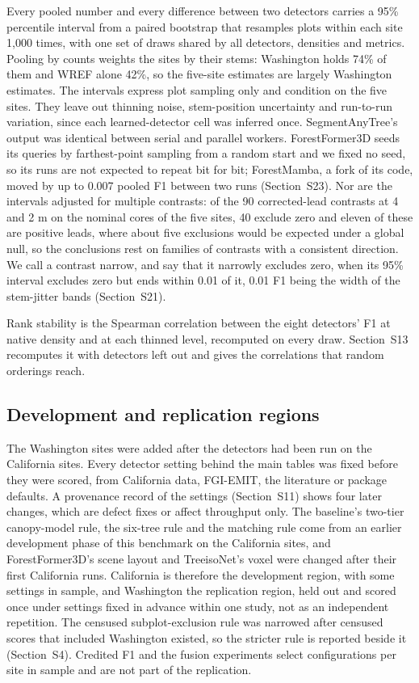 \documentclass[preprint,12pt,authoryear,a4paper]{elsarticle}
\begin{document}
Every pooled number and every difference between two detectors carries a 95\%
percentile interval from a paired bootstrap that resamples plots within each
site 1,000 times, with one set of draws shared by all detectors, densities and
metrics. Pooling by counts weights the sites by their stems: Washington holds
74\% of them and WREF alone 42\%, so the five-site estimates are largely
Washington estimates. The intervals express plot sampling only and condition on
the five sites. They leave out thinning noise, stem-position uncertainty and
run-to-run variation, since each learned-detector cell was inferred once.
SegmentAnyTree's output was identical between serial and parallel workers.
ForestFormer3D seeds its queries by farthest-point sampling from a random start
and we fixed no seed, so its runs are not expected to repeat bit for bit;
ForestMamba, a fork of its code, moved by up to 0.007 pooled F1 between two runs
(Section~S23). Nor are the intervals adjusted for multiple contrasts: of the 90
corrected-lead contrasts at 4 and 2 m on the nominal cores of the five sites, 40
exclude zero and eleven of these are positive leads, where about five exclusions
would be expected under a global null, so the conclusions rest on families of
contrasts with a consistent direction. We call a contrast narrow, and say that
it narrowly excludes zero, when its 95\% interval excludes zero but ends within
0.01 of it, 0.01 F1 being the width of the stem-jitter bands (Section~S21).

Rank stability is the Spearman correlation between the eight detectors' F1 at
native density and at each thinned level, recomputed on every draw. Section~S13
recomputes it with detectors left out and gives the correlations that random
orderings reach.

\subsection{Development and replication regions}\label{sec:4.5}

The Washington sites were added after the detectors had been run on the
California sites. Every detector setting behind the main tables was fixed before
they were scored, from California data, FGI-EMIT, the literature or package
defaults. A provenance record of the settings (Section~S11) shows four later
changes, which are defect fixes or affect throughput only. The baseline's
two-tier canopy-model rule, the six-tree rule and the matching rule come from an
earlier development phase of this benchmark on the California sites, and
ForestFormer3D's scene layout and TreeisoNet's voxel were changed after their
first California runs. California is therefore the development region, with some
settings in sample, and Washington the replication region, held out and scored
once under settings fixed in advance within one study, not as an independent
repetition. The censused subplot-exclusion rule was narrowed after censused
scores that included Washington existed, so the stricter rule is reported beside
it (Section~S4). Credited F1 and the fusion experiments select configurations
per site in sample and are not part of the replication.
\end{document}
